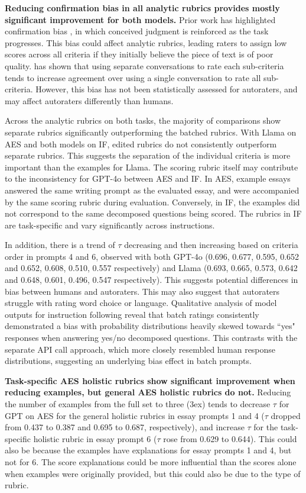 \textbf{Reducing confirmation bias in all analytic rubrics provides mostly significant improvement for both models.} 
Prior work has highlighted confirmation bias \citep{doi:10.1518/001872008X354183}, in which conceived judgment is reinforced as the task progresses. This bias could affect analytic rubrics, leading raters to assign low scores across all criteria if they initially believe the piece of text is of poor quality. \citet{lee-etal-2024-unleashing} has shown that using separate conversations to rate each sub-criteria tends to increase agreement over using a single conversation to rate all sub-criteria. However, this bias has not been statistically assessed for autoraters, and may affect autoraters differently than humans. 

Across the analytic rubrics on both tasks, the majority of comparisons show separate rubrics significantly outperforming the batched rubrics. With Llama on AES and both models on IF, edited rubrics do not consistently outperform separate rubrics. This suggests the separation of the individual criteria is more important than the examples for Llama. The scoring rubric itself may contribute to the inconsistency for GPT-4o between AES and IF. In AES, example essays answered the same writing prompt as the evaluated essay, and were accompanied by the same scoring rubric during evaluation. Conversely, in IF, the examples did not correspond to the same decomposed questions being scored. The rubrics in IF are task-specific and vary significantly across instructions. 

In addition, there is a trend of $\tau$ decreasing and then increasing based on criteria order in prompts 4 and 6, observed with both GPT-4o (0.696, 0.677, 0.595, 0.652 and 0.652, 0.608, 0.510, 0.557 respectively) and Llama (0.693, 0.665, 0.573, 0.642 and 0.648, 0.601, 0.496, 0.547 respectively). This suggests potential differences in bias between humans and autoraters. This may also suggest that autoraters struggle with rating word choice or language. Qualitative analysis of model outputs for instruction following reveal that batch ratings consistently demonstrated a bias with probability distributions heavily skewed towards ``yes" responses when answering yes/no decomposed questions. This contrasts with the separate API call approach, which more closely resembled  human response distributions, suggesting an underlying bias effect in batch prompts.

\textbf{Task-specific AES holistic rubrics show significant improvement when reducing examples, but general AES holistic rubrics do not.} Reducing the number of examples from the full set to three (3ex) tends to decrease $\tau$ for GPT on AES for the general holistic rubrics in essay prompts 1 and 4 ($\tau$ dropped from 0.437 to 0.387 and 0.695 to 0.687, respectively), and increase $\tau$ for the task-specific holistic rubric in essay prompt 6 ($\tau$ rose from 0.629 to 0.644). This could also be because the examples have explanations for essay prompts 1 and 4, but not for 6. The score explanations could be more influential than the scores alone when examples were originally provided, but this could also be due to the type of rubric.

